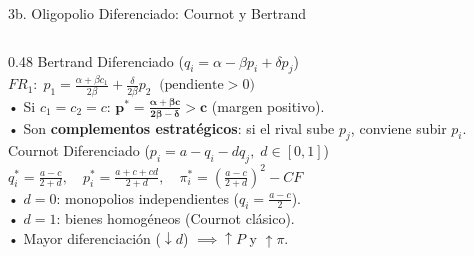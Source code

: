 \documentclass[aspectratio=169, 10pt]{beamer}
\begin{document}
\begin{frame}{3b. Oligopolio Diferenciado: Cournot y Bertrand}
\begin{columns}[T]
    \begin{column}{0.48\textwidth}
      {\scriptsize\color{grisTexto}Bertrand Diferenciado (\(q_i = \alpha - \beta p_i + \delta p_j\))}\\[1pt]
      {\small\color{azulPrincipal}\textbf{\(FR_1:\; p_1 = \frac{\alpha + \beta c_1}{2\beta} + \frac{\delta}{2\beta}p_2 \;\; \text{(pendiente} > 0\text{)}\)}}\\[2pt]
      {\scriptsize
        • Si \(c_1 = c_2 = c\): \(\mathbf{p^* = \frac{\alpha + \beta c}{2\beta - \delta} > c}\) (margen positivo).\\
        • Son \textbf{complementos estratégicos}: si el rival sube \(p_j\), conviene subir \(p_i\).\\[4pt]
      }
      {\scriptsize\color{grisTexto}Cournot Diferenciado (\(p_i = a - q_i - d q_j,\; d \in [0, 1]\))}\\[1pt]
      {\small\color{verdeAcento}\textbf{\(q_i^* = \frac{a-c}{2+d},\quad p_i^* = \frac{a+c+cd}{2+d},\quad \pi_i^* = \left(\frac{a-c}{2+d}\right)^2 - CF\)}}\\[2pt]
      {\scriptsize
        • \(d = 0\): monopolios independientes (\(q_i = \frac{a-c}{2}\)).\\
        • \(d = 1\): bienes homogéneos (Cournot clásico).\\
        • Mayor diferenciación (\(\downarrow d\)) \(\implies \uparrow P\) y \(\uparrow \pi\).
      }
    \end{column}
  \end{columns}

\end{frame}
\end{document}
